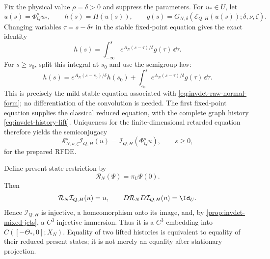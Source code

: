 Fix the physical value \(\rho=\delta>0\) and suppress the parameters.  For
\(u_*\in U\), let
\begin{equation}
 u(s)=\Phi_Q^su_*,\qquad h(s)=H(u(s)),\qquad
 g(s)=G_{N,\delta}(\mathcal E_{Q,H}(u(s));
                         \delta,\nu,\zeta).
\end{equation}
Changing variables \(\tau=s-\delta r\) in the stable fixed-point equation
gives the exact identity
\begin{equation}
 h(s)=\int_{-\infty}^s
 e^{A_N(s-\tau)/\delta}g(\tau)\,\dd\tau.             \label{eq:invdet-stable-complete-convolution}
\end{equation}
For \(s\geq s_0\), split this integral at \(s_0\) and use the semigroup
law:
\begin{equation}
 h(s)=e^{A_N(s-s_0)/\delta}h(s_0)
 +\int_{s_0}^s e^{A_N(s-\tau)/\delta}g(\tau)\,\dd\tau.            \label{eq:invdet-mild-stable-equation}
\end{equation}
This is precisely the mild stable equation associated with
\cref{eq:invdet-raw-normal-form}; no differentiation of the convolution is
needed.  The first fixed-point equation supplies the classical reduced
equation, with the complete graph history
\cref{eq:invdet-history-lift}.  Uniqueness for the finite-dimensional
retarded equation therefore yields the semiconjugacy
\begin{equation}
 \mathcal S_{N,\nu,\zeta}^s\mathcal I_{Q,H}(u)
 =\mathcal I_{Q,H}(\Phi_Q^su),
 \qquad s\geq0,                                      \label{eq:invdet-semiconjugacy}
\end{equation}
for the prepared RFDE.

Define present-state restriction by
\begin{equation}
 \mathcal R_N(\Psi)=\pi_U\Psi(0).
\end{equation}
Then
\begin{equation}
 \mathcal R_N\mathcal I_{Q,H}(u)=u,\qquad
 D\mathcal R_ND\mathcal I_{Q,H}(u)=\Id_U.            \label{eq:invdet-left-inverse}
\end{equation}
Hence \(\mathcal I_{Q,H}\) is injective, a homeomorphism onto its image,
and, by \cref{prop:invdet-mixed-jets}, a \(C^3\) injective immersion.  Thus
it is a \(C^3\) embedding into
\(C([ -\Theta_*,0];X_N)\).  Equality of two lifted histories is equivalent
to equality of their reduced present states; it is not merely an equality
after stationary projection.

